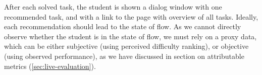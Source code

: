 After each solved task, the student is shown a dialog window with one
recommended task, and with a link to the page with overview of all tasks.
Ideally, each recommendation should lead to the state of flow.
As we cannot directly observe whether the student is in the state of flow,
we must rely on a proxy data, which can be either subjective
(using perceived difficulty ranking),
or objective (using observed performance), %
as we have discussed in section
on attributable metrics (\cref{sec:live-evaluation}).

